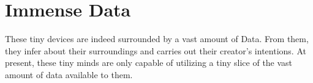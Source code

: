 \documentclass[../../main]{subfiles}
\begin{document}
\section{Immense Data} \label{sec:}

These tiny devices are indeed surrounded by a vast amount of Data. From them, they infer
about their surroundings and carries out their creator's intentions. At present, these
tiny minds are only capable of utilizing a tiny slice of the vast amount of data available
to them.
\end{document}
